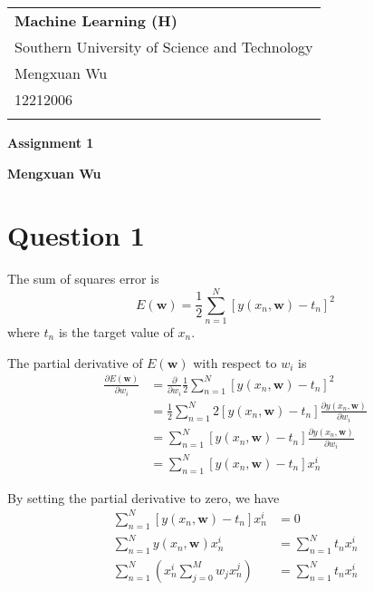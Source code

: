 \documentclass[a4paper,12pt]{article}
\newcommand{\pard}[2]{\frac{\partial #1}{\partial #2}}
\begin{document}
\thispagestyle{empty} %

\begin{tabular}{p{15.5cm}}
{\large \bf Machine Learning (H)} \\
Southern University of Science and Technology \\ Mengxuan Wu \\ 12212006 \\
\hline
\\
\end{tabular}

\vspace*{0.3cm} %

\begin{center}
	{\Large \bf Assignment 1}
	\vspace{2mm}

	{\bf Mengxuan Wu}
		
\end{center}  

\vspace{0.4cm}

\section*{Question 1}

The sum of squares error is
\begin{equation*}
	E(\mathbf{w}) = \frac{1}{2} \sum_{n=1}^{N} [y(x_n, \mathbf{w}) - t_n]^2
\end{equation*}
where $t_n$ is the target value of $x_n$.

The partial derivative of $E(\mathbf{w})$ with respect to $w_i$ is
\begin{align*}
	\pard{E(\mathbf{w})}{w_i} &= \pard{}{w_i} \frac{1}{2} \sum_{n=1}^{N} [y(x_n, \mathbf{w}) - t_n]^2 \\
	&= \frac{1}{2} \sum_{n=1}^{N} 2 [y(x_n, \mathbf{w}) - t_n] \pard{y(x_n, \mathbf{w})}{w_i} \\
	&= \sum_{n=1}^{N} [y(x_n, \mathbf{w}) - t_n] \pard{y(x_n, \mathbf{w})}{w_i} \\
	&= \sum_{n=1}^{N} [y(x_n, \mathbf{w}) - t_n] x_n^i
\end{align*}

By setting the partial derivative to zero, we have
\begin{align*}
	\sum_{n=1}^{N} [y(x_n, \mathbf{w}) - t_n] x_n^i &= 0 \\
	\sum_{n=1}^{N} y(x_n, \mathbf{w}) x_n^i &= \sum_{n=1}^{N} t_n x_n^i \\
	\sum_{n=1}^{N} \left( x_n^i \sum_{j=0}^{M} w_j x_n^j \right) &= \sum_{n=1}^{N} t_n x_n^i
\end{align*}
\end{document}
